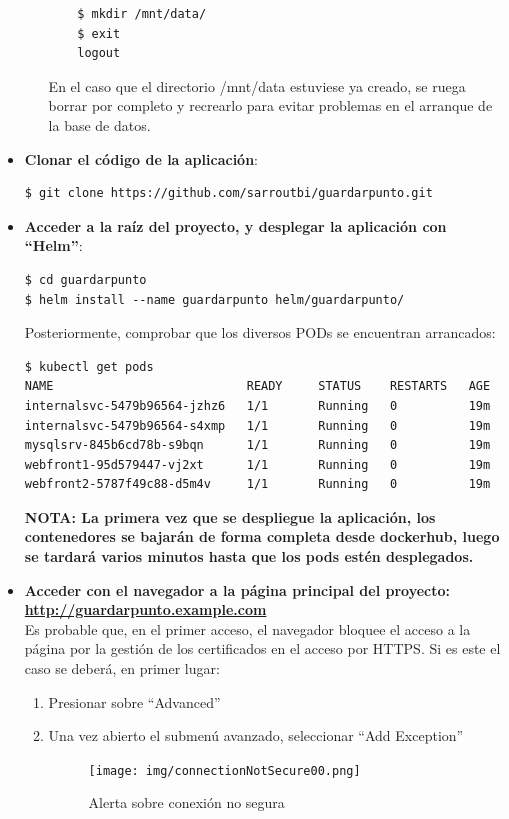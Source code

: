 \documentclass[12pt,spanish]{article}
\begin{document}
\begin{itemize}
\begin{itemize}
\begin{verbatim}
    $ mkdir /mnt/data/
    $ exit
    logout
  \end{verbatim}
  En el caso que el directorio /mnt/data estuviese ya creado, se ruega borrar por completo y recrearlo para evitar problemas en el arranque de la base de datos.
  \end{itemize}
\item{\textbf{Clonar el código de la aplicación}}:
\begin{verbatim}
$ git clone https://github.com/sarroutbi/guardarpunto.git
\end{verbatim}
\item{\textbf{Acceder a la raíz del proyecto, y desplegar la aplicación con ``Helm''}}:
\begin{verbatim}
$ cd guardarpunto
$ helm install --name guardarpunto helm/guardarpunto/
\end{verbatim}
Posteriormente, comprobar que los diversos PODs se encuentran arrancados:
\begin{verbatim}
$ kubectl get pods
NAME                           READY     STATUS    RESTARTS   AGE
internalsvc-5479b96564-jzhz6   1/1       Running   0          19m
internalsvc-5479b96564-s4xmp   1/1       Running   0          19m
mysqlsrv-845b6cd78b-s9bqn      1/1       Running   0          19m
webfront1-95d579447-vj2xt      1/1       Running   0          19m
webfront2-5787f49c88-d5m4v     1/1       Running   0          19m
\end{verbatim}
\textbf{NOTA: La primera vez que se despliegue la aplicación, los contenedores se bajarán de forma completa desde dockerhub, luego se tardará varios minutos hasta que los pods estén desplegados.}
\item{\textbf{Acceder con el navegador a la página principal del proyecto:\\
\url{http://guardarpunto.example.com}}}\\
Es probable que, en el primer acceso, el navegador bloquee el acceso a la página por la gestión de los certificados en el acceso por HTTPS. Si es este el caso se deberá, en primer lugar:
\begin{enumerate}
\item{Presionar sobre ``Advanced''}
\item{Una vez abierto el submenú avanzado, seleccionar ``Add Exception''}
\begin{center}
 \begin{figure}[H]
 \begin{center}
   \texttt{[image: img/connectionNotSecure00.png]}
   \caption{Alerta sobre conexión no segura}

\end{center}
\end{figure}
\end{center}
\end{enumerate}
\end{itemize}
\end{document}
